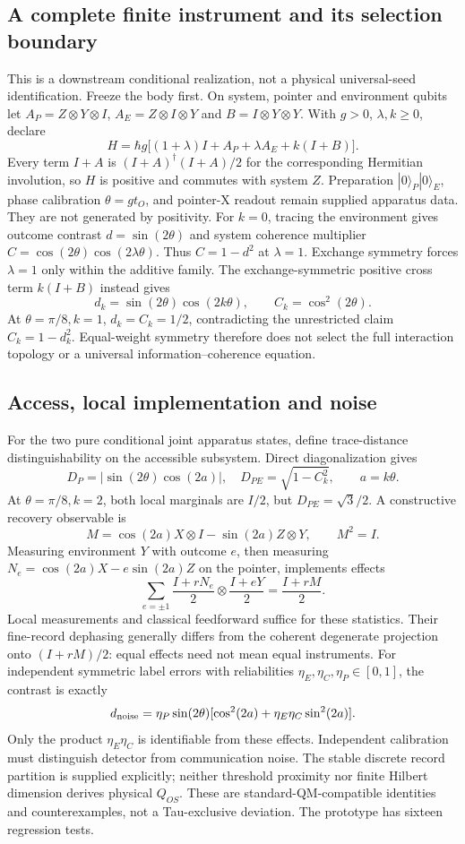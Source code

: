 \documentclass[11pt]{article}
\begin{document}
\subsection{A complete finite instrument and its selection boundary}
This is a downstream conditional realization, not a physical universal-seed
identification. Freeze the body first. On system, pointer and environment
qubits let $A_P=Z\otimes Y\otimes I$, $A_E=Z\otimes I\otimes Y$ and
$B=I\otimes Y\otimes Y$. With $g>0$, $\lambda,k\geq0$, declare
\[
 H=\hbar g\big[(1+\lambda)I+A_P+\lambda A_E+k(I+B)\big].
\]
Every term $I+A$ is $(I+A)^\dagger(I+A)/2$ for the corresponding Hermitian
involution, so $H$ is positive and commutes with system $Z$. Preparation
$|0\rangle_P|0\rangle_E$, phase calibration $\theta=gt_O$, and pointer-X
readout remain supplied apparatus data. They are not generated by positivity.
For $k=0$, tracing the environment gives outcome contrast
$d=\sin(2\theta)$ and system coherence multiplier
$C=\cos(2\theta)\cos(2\lambda\theta)$. Thus $C=1-d^2$ at $\lambda=1$.
Exchange symmetry forces $\lambda=1$ only within the additive family.
The exchange-symmetric positive cross term $k(I+B)$ instead gives
\[
 d_k=\sin(2\theta)\cos(2k\theta),\qquad C_k=\cos^2(2\theta).
\]
At $\theta=\pi/8,k=1$, $d_k=C_k=1/2$, contradicting the unrestricted
claim $C_k=1-d_k^2$. Equal-weight symmetry therefore does not select the
full interaction topology or a universal information--coherence equation.

\subsection{Access, local implementation and noise}
For the two pure conditional joint apparatus states, define trace-distance
distinguishability on the accessible subsystem. Direct diagonalization gives
\[
 D_P=|\sin(2\theta)\cos(2a)|,\quad
 D_{PE}=\sqrt{1-C_k^2},\qquad a=k\theta.
\]
At $\theta=\pi/8,k=2$, both local marginals are $I/2$, but
$D_{PE}=\sqrt3/2$. A constructive recovery observable is
\[
 M=\cos(2a)X\otimes I-\sin(2a)Z\otimes Y,\qquad M^2=I.
\]
Measuring environment $Y$ with outcome $e$, then measuring
$N_e=\cos(2a)X-e\sin(2a)Z$ on the pointer, implements effects
\[
 \sum_{e=\pm1}\frac{I+rN_e}{2}\otimes\frac{I+eY}{2}
 =\frac{I+rM}{2}.
\]
Local measurements and classical feedforward suffice for these statistics.
Their fine-record dephasing generally differs from the coherent degenerate
projection onto $(I+rM)/2$: equal effects need not mean equal instruments.
For independent symmetric label errors with reliabilities
$\eta_E,\eta_C,\eta_P\in[0,1]$, the contrast is exactly
\[
 d_{\rm noise}=\eta_P\sin(2\theta)
 [\cos^2(2a)+\eta_E\eta_C\sin^2(2a)].
\]
Only the product $\eta_E\eta_C$ is identifiable from these effects.
Independent calibration must distinguish detector from communication noise.
The stable discrete record partition is supplied explicitly; neither
threshold proximity nor finite Hilbert dimension derives physical $Q_{OS}$.
These are standard-QM-compatible identities and counterexamples, not a
Tau-exclusive deviation. The prototype has sixteen regression tests.
\end{document}
